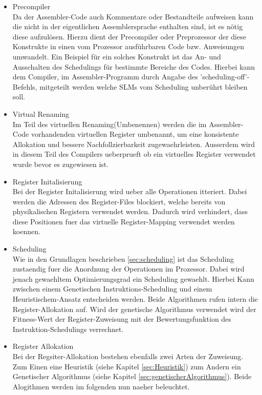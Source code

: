 \begin{itemize}
	\item Precompiler\\
		Da der Assembler-Code auch Kommentare oder Bestandteile aufweisen kann die nicht in der eigentlichen Assemblersprache enthalten sind, ist es nötig diese aufzulösen. Hierzu dient der Precompiler oder Preprozessor der diese Konstrukte in einen vom Prozessor ausführbaren Code bzw. Anweisungen umwandelt. Ein Beispiel für ein solches Konstrukt ist das An- und Ausschalten des Schedulings für bestimmte Bereiche des Codes. Hierbei kann dem Compiler, im Assembler-Programm durch Angabe des 'scheduling-off'-Befehls, mitgeteilt werden welche SLMs vom Scheduling unberührt bleiben soll.
	\item Virtual Renaming\\
		Im Teil des virtuellen Renaming(Umbenennen) werden die im Assembler-Code vorhandenden virtuellen Register umbenannt, um eine konsistente Allokation und bessere Nachfollzierbarkeit zugewaehrleisten. Ausserdem wird in diesem Teil des Compilers ueberprueft ob ein virtuelles Register verwendet wurde bevor es zugewiesen ist.
	\item Register Initalisierung\\
		Bei der Register Initalisierung wird ueber alle Operationen itteriert. Dabei werden die Adressen des Register-Files blockiert, welche bereits von physikalischen Registern verwendet werden. Dadurch wird verhindert, dass diese Positionen fuer das virtuelle Register-Mapping verwendet werden koennen.
	\item Scheduling\\
		Wie in den Grundlagen beschrieben \ref{sec:scheduling} ist das Scheduling zustaendig fuer die Anordnung der Operationen im Prozessor. Dabei wird jenach gewaehltem Optimierungsgrad ein Scheduling gewaehlt. Hierbei Kann zwischen einem Genetischen Instruktions-Scheduling und einem Heuristischem-Ansatz entscheiden werden. Beide Algorithmen rufen intern die Register-Allokation auf. Wird der genetische Algorithmus verwendet wird der Fitness-Wert der Register-Zuweisung mit der Bewertungsfunktion des Instruktion-Schedulings verrechnet.
	\item Register Allokation\\
		Bei der Regsiter-Allokation bestehen ebenfalls zwei Arten der Zuweisung. Zum Einen eine Heuristik (siehe Kapitel \ref{sec:Heuristik}) zum Andern ein Genetischer Algorithmus (siehe Kapitel \ref{sec:genetischerAlgorithmus}). Beide Alogithmen werden im folgenden nun naeher beleuchtet.
\end{itemize}


